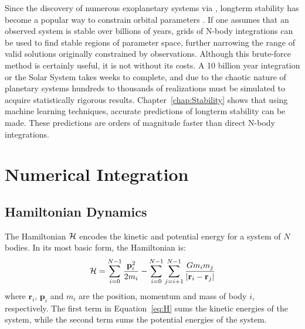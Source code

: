Since the discovery of numerous exoplanetary systems via \kep, longterm stability has become a popular way to constrain orbital parameters \citep{Lissauer2011, Steffen2013, Jontof-Hutter2014, Tamayo2015}. 
If one assumes that an observed system is stable over billions of years, grids of N-body integrations can be used to find stable regions of parameter space, further narrowing the range of valid solutions originally constrained by observations. 
Although this brute-force method is certainly useful, it is not without its costs. 
A 10 billion year integration or the Solar System takes weeks to complete, and due to the chaotic nature of planetary systems hundreds to thousands of realizations must be simulated to acquire statistically rigorous results. 
Chapter~\ref{chap:Stability} shows that using machine learning techniques, accurate predictions of longterm stability can be made. 
These predictions are orders of magnitude faster than direct N-body integrations. 

\section{Numerical Integration}
\subsection{Hamiltonian Dynamics}
The Hamiltonian $\mathcal{H}$ encodes the kinetic and potential energy for a system of $N$ bodies. 
In its most basic form, the Hamiltonian is:
\begin{equation}
\mathcal{H}  = \sum_{i=0}^{N-1} \frac{\textbf{p}_i^2}{2m_i} - \sum_{i=0}^{N-1} \sum_{j=i+1}^{N-1} \frac{Gm_im_j}{|\textbf{r}_i - \textbf{r}_j|}
\label{eq:H}
\end{equation}
where $\textbf{r}_i$, $\textbf{p}_i$ and $m_i$ are the position, momentum and mass of body $i$, respectively. 
The first term in Equation~\ref{eq:H} sums the kinetic energies of the system, while the second term sums the potential energies of the system.

